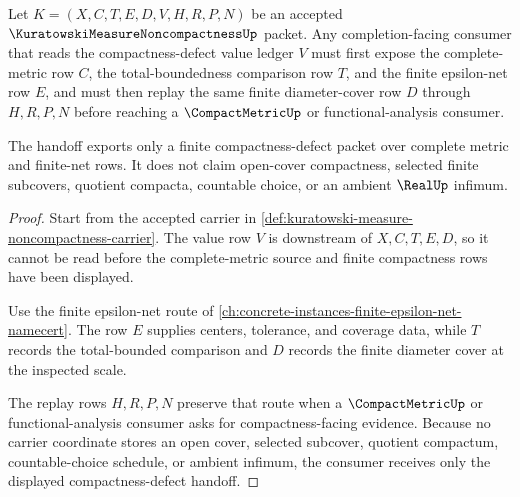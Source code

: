\begin{theorem}
\label{thm:kuratowski-measure-noncompactness-complete-metric-handoff}
Let $K=(X,C,T,E,D,V,H,R,P,N)$ be an accepted $\KuratowskiMeasureNoncompactnessUp$ packet. Any completion-facing consumer that reads the compactness-defect value ledger $V$ must first expose the complete-metric row $C$, the total-boundedness comparison row $T$, and the finite epsilon-net row $E$, and must then replay the same finite diameter-cover row $D$ through $H,R,P,N$ before reaching a $\CompactMetricUp$ or functional-analysis consumer.

The handoff exports only a finite compactness-defect packet over complete metric and finite-net rows. It does not claim open-cover compactness, selected finite subcovers, quotient compacta, countable choice, or an ambient $\RealUp$ infimum.
\end{theorem}
\begin{proof}
Start from the accepted carrier in \autoref{def:kuratowski-measure-noncompactness-carrier}. The value row $V$ is downstream of $X,C,T,E,D$, so it cannot be read before the complete-metric source and finite compactness rows have been displayed.

Use the finite epsilon-net route of \autoref{ch:concrete-instances-finite-epsilon-net-namecert}. The row $E$ supplies centers, tolerance, and coverage data, while $T$ records the total-bounded comparison and $D$ records the finite diameter cover at the inspected scale.

The replay rows $H,R,P,N$ preserve that route when a $\CompactMetricUp$ or functional-analysis consumer asks for compactness-facing evidence. Because no carrier coordinate stores an open cover, selected subcover, quotient compactum, countable-choice schedule, or ambient infimum, the consumer receives only the displayed compactness-defect handoff.
\end{proof}



